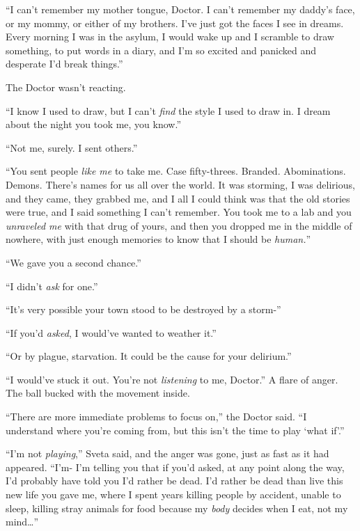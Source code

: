 ``I can't remember my mother tongue, Doctor.  I can't remember my daddy's face, or my mommy, or either of my brothers.  I've just got the faces I see in dreams.  Every morning I was in the asylum, I would wake up and I scramble to draw something, to put words in a diary, and I'm so excited and panicked and desperate I'd break things.''



The Doctor wasn't reacting.



``I know I used to draw, but I can't \emph{find} the style I used to draw in.  I dream about the night you took me, you know.''



``Not me, surely.  I sent others.''



``You sent people \emph{like me} to take me.  Case fifty-threes.  Branded.  Abominations.  Demons.  There's names for us all over the world.  It was storming, I was delirious, and they came, they grabbed me, and I all I could think was that the old stories were true, and I said something I can't remember.  You took me to a lab and you \emph{unraveled me }with that drug of yours, and then you dropped me in the middle of nowhere, with just enough memories to know that I should be \emph{human.}''



``We gave you a second chance.''



``I didn't \emph{ask} for one.''



``It's very possible your town stood to be destroyed by a storm-''



``If you'd \emph{asked}, I would've wanted to weather it.''



``Or by plague, starvation.  It could be the cause for your delirium.''



``I would've stuck it out.  You're not \emph{listening} to me, Doctor.''  A flare of anger.  The ball bucked with the movement inside.



``There are more immediate problems to focus on,'' the Doctor said.  ``I understand where you're coming from, but this isn't the time to play `what if'.''



``I'm not \emph{playing},'' Sveta said, and the anger was gone, just as fast as it had appeared.  ``I'm- I'm telling you that if you'd asked, at any point along the way, I'd probably have told you I'd rather be dead.  I'd rather be dead than live this new life you gave me, where I spent years killing people by accident, unable to sleep, killing stray animals for food because my \emph{body} decides when I eat, not my mind\ldots''



